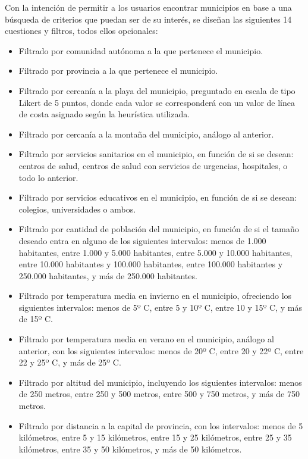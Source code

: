 Con la intención de permitir a los usuarios encontrar municipios en base a una búsqueda de criterios que puedan ser de su interés, se diseñan las siguientes 14 cuestiones y filtros, todos ellos opcionales:

\begin{itemize}
    \item Filtrado por comunidad autónoma a la que pertenece el municipio.
    \item Filtrado por provincia a la que pertenece el municipio.
    \item Filtrado por cercanía a la playa del municipio, preguntado en escala de tipo Likert de 5 puntos, donde cada valor se corresponderá con un valor de línea de costa asignado según la heurística utilizada.
    \item Filtrado por cercanía a la montaña del municipio, análogo al anterior.
    \item Filtrado por servicios sanitarios en el municipio, en función de si se desean: centros de salud, centros de salud con servicios de urgencias, hospitales, o todo lo anterior.
    \item Filtrado por servicios educativos en el municipio, en función de si se desean: colegios, universidades o ambos.
    \item Filtrado por cantidad de población del municipio, en función de si el tamaño deseado entra en alguno de los siguientes intervalos: menos de 1.000 habitantes, entre 1.000 y 5.000 habitantes, entre 5.000 y 10.000 habitantes, entre 10.000 habitantes y 100.000 habitantes, entre 100.000 habitantes y 250.000 habitantes, y más de 250.000 habitantes.
    \item Filtrado por temperatura media en invierno en el municipio, ofreciendo los siguientes intervalos: menos de 5º C, entre 5 y 10º C, entre 10 y 15º C, y más de 15º C.
    \item Filtrado por temperatura media en verano en el municipio, análogo al anterior, con los siguientes intervalos: menos de 20º C, entre 20 y 22º C, entre 22 y 25º C, y más de 25º C.
    \item Filtrado por altitud del municipio, incluyendo los siguientes intervalos: menos de 250 metros, entre 250 y 500 metros, entre 500 y 750 metros, y más de 750 metros.
    \item Filtrado por distancia a la capital de provincia, con los intervalos: menos de 5 kilómetros, entre 5 y 15 kilómetros, entre 15 y 25 kilómetros, entre 25 y 35 kilómetros, entre 35 y 50 kilómetros, y más de 50 kilómetros.

\end{itemize}
